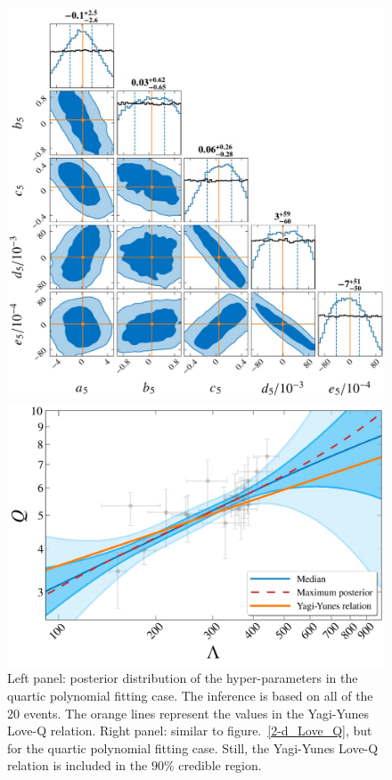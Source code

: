 \documentclass[a4paper,11pt]{article}
\begin{document}
\begin{figure}
\begin{minipage}[t]{0.49\textwidth}
\centering
\includegraphics[width=0.8\linewidth]{Hyper_parameter_5d.pdf}%
\end{minipage}
\hfill
\begin{minipage}[t]{0.49\textwidth}
\includegraphics[width=\linewidth]{hierarchical_results_AP4_5d.pdf}
\end{minipage}
    \caption{\label{5-d_Love_Q} Left panel: posterior distribution of the hyper-parameters in the quartic polynomial fitting case. The inference is based on all of the 20 events. The orange lines represent the values in the Yagi-Yunes Love-Q relation. Right panel: similar to figure.~\ref{2-d_Love_Q}, but for the quartic polynomial fitting case. Still, the Yagi-Yunes Love-Q relation is included in the $90\%$ credible region.} 
\end{figure}
\end{document}
